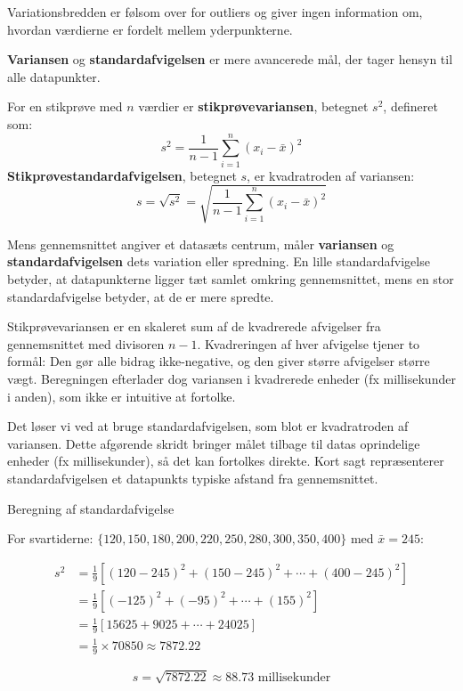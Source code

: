 \begin{remark}
Variationsbredden er følsom over for outliers og giver ingen information om, hvordan værdierne er fordelt mellem yderpunkterne.
\end{remark}

\textbf{Variansen} og \textbf{standardafvigelsen} er mere avancerede mål, der tager hensyn til alle datapunkter.

\begin{definition}
For en stikprøve med $n$ værdier er \textbf{stikprøvevariansen}, betegnet $s^2$, defineret som:
$$
s^2 = \frac{1}{n-1}\sum_{i=1}^{n}(x_i - \bar{x})^2
$$
\textbf{Stikprøvestandardafvigelsen}, betegnet $s$, er kvadratroden af variansen:
$$
s = \sqrt{s^2} = \sqrt{\frac{1}{n-1}\sum_{i=1}^{n}(x_i - \bar{x})^2}
$$
\end{definition}

Mens gennemsnittet angiver et datasæts centrum, måler \textbf{variansen} og \textbf{standardafvigelsen} dets variation eller spredning. En lille standardafvigelse betyder, at datapunkterne ligger tæt samlet omkring gennemsnittet, mens en stor standardafvigelse betyder, at de er mere spredte.

Stikprøvevariansen er en skaleret sum af de kvadrerede afvigelser fra gennemsnittet med divisoren $n-1$. Kvadreringen af hver afvigelse tjener to formål: Den gør alle bidrag ikke-negative, og den giver større afvigelser større vægt. Beregningen efterlader dog variansen i kvadrerede enheder (fx millisekunder i anden), som ikke er intuitive at fortolke.

Det løser vi ved at bruge standardafvigelsen, som blot er kvadratroden af variansen. Dette afgørende skridt bringer målet tilbage til datas oprindelige enheder (fx millisekunder), så det kan fortolkes direkte. Kort sagt repræsenterer standardafvigelsen et datapunkts typiske afstand fra gennemsnittet.

\begin{example} Beregning af standardafvigelse

    For svartiderne: $\{120, 150, 180, 200, 220, 250, 280, 300, 350, 400\}$ med $\bar{x} = 245$:

\begin{align*}
s^2 &= \frac{1}{9}[(120-245)^2 + (150-245)^2 + \cdots + (400-245)^2] \\
&= \frac{1}{9}[(-125)^2 + (-95)^2 + \cdots + (155)^2] \\
&= \frac{1}{9}[15625 + 9025 + \cdots + 24025] \\
    &= \frac{1}{9} \times 70850 \approx 7872.22
\end{align*}

\[
s = \sqrt{7872.22} \approx 88.73 \text{ millisekunder}
\]
\end{example}

